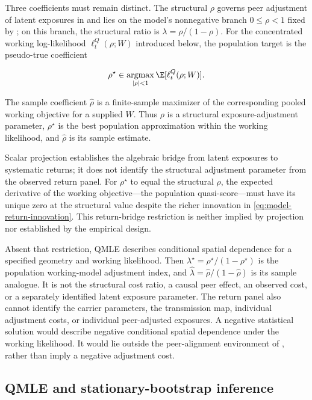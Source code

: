 Three coefficients must remain distinct.
The structural $\rho$ governs peer adjustment of latent exposures in
 and lies on the model's nonnegative branch
$0\leq\rho<1$ fixed by ; on this branch, the structural
ratio is $\lambda=\rho/(1-\rho)$.
For the concentrated working log-likelihood $\ell_t^Q(\rho;W)$ introduced
below, the population target is the pseudo-true coefficient

\[
  \rho^\star
  \in\operatorname*{argmax}_{|\rho|<1}
  \E[\ell_t^Q(\rho;W)].
\]

The sample coefficient $\hat\rho$ is a finite-sample maximizer of the
corresponding pooled working objective for a supplied $W$.
Thus $\rho$ is a structural exposure-adjustment parameter, $\rho^\star$ is the
best population approximation within the working likelihood, and $\hat\rho$
is its sample estimate.

Scalar projection establishes the algebraic bridge from latent exposures to
systematic returns; it does not identify the structural adjustment parameter
from the observed return panel.
For $\rho^\star$ to equal the structural $\rho$, the expected derivative of the
working objective---the population quasi-score---must have its unique zero at
the structural value despite the richer innovation in
\eqref{eq:model-return-innovation}.
This return-bridge restriction is neither implied by projection nor established
by the empirical design.

Absent that restriction, QMLE describes conditional spatial dependence for a
specified geometry and working likelihood.
Then $\lambda^\star=\rho^\star/(1-\rho^\star)$ is the population working-model
adjustment index, and
$\hat\lambda=\hat\rho/(1-\hat\rho)$ is its sample analogue.
It is not the structural cost ratio, a causal peer effect, an observed cost, or
a separately identified latent exposure parameter.
The return panel also cannot identify the carrier parameters, the transmission
map, individual adjustment costs, or individual peer-adjusted exposures.
A negative statistical solution would describe negative conditional spatial
dependence under the working likelihood.
It would lie outside the peer-alignment environment of , rather
than imply a negative adjustment cost.

\subsection{QMLE and stationary-bootstrap inference}

